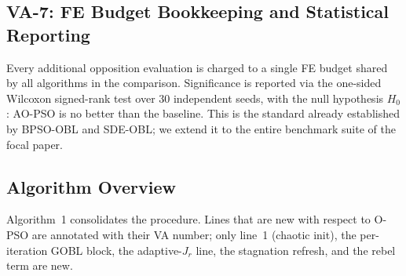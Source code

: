 \documentclass[11pt,a4paper]{article}
\newcommand{\algoname}{AO-PSO}
\newcommand{\opso}{O-PSO}
\begin{document}
\subsection{VA-7: FE Budget Bookkeeping and Statistical Reporting}

Every additional opposition evaluation is charged to a single FE budget
shared by all algorithms in the comparison. Significance is reported via
the one-sided Wilcoxon signed-rank test over $30$ independent seeds, with
the null hypothesis $H_0$: \algoname{} is no better than the baseline.
This is the standard already established by BPSO-OBL and SDE-OBL; we
extend it to the entire benchmark suite of the focal paper.

\subsection{Algorithm Overview}

Algorithm~1 consolidates the procedure. Lines that are new with respect to
\opso{} are annotated with their VA number; only line~1 (chaotic init),
the per-iteration GOBL block, the adaptive-$J_r$ line, the stagnation
refresh, and the rebel term are new.
\end{document}
